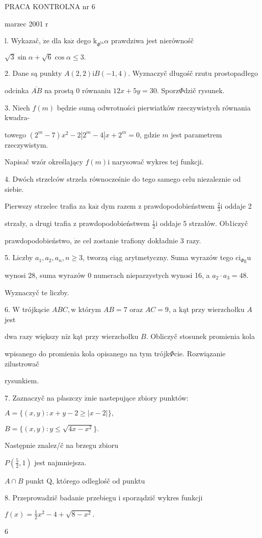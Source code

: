 \documentclass[a4paper,12pt]{article}
\begin{document}
PRACA KONTROLNA nr 6

marzec 2001 r

l. Wykazač, $\dot{\mathrm{z}}\mathrm{e}$ dla $\mathrm{k}\mathrm{a}\dot{\mathrm{z}}$ dego $\mathrm{k}_{\Phi^{\mathrm{t}\mathrm{a}}} \alpha$ prawdziwa jest nierównośč

$\sqrt{3}\sin\alpha+\sqrt{6}\cos\alpha\leq 3.$

2. Dane są punkty $A(2,2) \mathrm{i} B(-1,4)$. Wyznaczyč długośč rzutu prostopadłego

odcinka $\overline{AB}$ na prostą $0$ równaniu $12x+5y=30$. Sporz$\Phi$dzič rysunek.

3. Niech $f(m)$ będzie sumą odwrotności pierwiatków rzeczywistych równania kwadra-

towego $(2^{m}-7)x^{2}-2|2^{m}-4|x+2^{m}=0$, gdzie $m$ jest parametrem rzeczywistym.

Napisač wzór określający $f(m)\mathrm{i}$ narysowač wykres tej funkcji.

4. Dwóch strzelców strzela równocześnie do tego samego celu niezaleznie od siebie.

Pierwszy strzelec trafia za $\mathrm{k}\mathrm{a}\dot{\mathrm{z}}$ dym razem $\mathrm{z}$ prawdopodobieństwem $\displaystyle \frac{2}{3} \mathrm{i}$ oddaje 2

strzały, a drugi trafia $\mathrm{z}$ prawdopodobieństwem $\displaystyle \frac{1}{2} \mathrm{i}$ oddaje 5 strzałów. Ob1iczyč

prawdopodobieństwo, $\dot{\mathrm{z}}\mathrm{e}$ cel zostanie trafiony dokładnie 3 razy.

5. Liczby $a_{1}, a_{2}, a_{n},  n\geq 3$, tworzą ciąg arytmetyczny. Suma wyrazów tego $\mathrm{c}\mathrm{i}_{\Phi \mathrm{g}}\mathrm{u}$

wynosi 28, suma wyrazów $0$ numerach nieparzystych wynosi 16, a $a_{2}\cdot a_{3}=48.$

Wyznaczyč te liczby.

6. $\mathrm{W}$ trójkącie $ABC, \mathrm{w}$ którym $AB=7$ oraz $AC=9$, a kąt przy wierzchołku $A$ jest

dwa razy większy $\mathrm{n}\mathrm{i}\dot{\mathrm{z}}$ kąt przy wierzchołku $B$. Obliczyč stosunek promienia kola

wpisanego do promienia kola opisanego na tym trójk$\Phi$cie. Rozwiązanie zilustrowač

rysunkiem.

7. Zaznaczyč na p{\it l}aszczy $\acute{\mathrm{z}}\mathrm{n}\mathrm{i}\mathrm{e}$ nastepujące zbiory punktów:

$A=\{(x,y):x+y-2\geq|x-2|\},$

$B=\{(x,y):y\leq\sqrt{4x-x^{2}}\}.$

Następnie znalez/č na brzegu zbioru

$P(\displaystyle \frac{5}{2},1)$ jest najmniejsza.

$A\cap B$ punkt $\mathrm{Q}$, którego odleglośč od punktu

8. Przeprowadzič badanie przebiegu i sporządzič wykres funkcji

$f(x)=\displaystyle \frac{1}{2}x^{2}-4+\sqrt{8-x^{2}}.$

6
\end{document}

